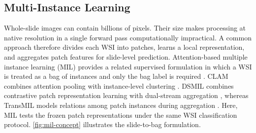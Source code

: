 \documentclass{midl}
\begin{document}
\subsection{Multi-Instance Learning}

Whole-slide images can contain billions of pixels. Their size makes processing at native resolution in a single forward pass computationally impractical. A common approach therefore divides each WSI into patches, learns a local representation, and aggregates patch features for slide-level prediction. Attention-based multiple instance learning (MIL) provides a related supervised formulation in which a WSI is treated as a bag of instances and only the bag label is required \cite{ilse_attention_2018}. CLAM combines attention pooling with instance-level clustering \cite{lu_data_2021}. DSMIL combines contrastive patch representation learning with dual-stream aggregation \cite{li_dualstream_2021}, whereas TransMIL models relations among patch instances during aggregation \cite{shao_transmil_2021}. Here, MIL tests the frozen patch representations under the same WSI classification protocol. \autoref{fig:mil-concept} illustrates the slide-to-bag formulation.
\end{document}
